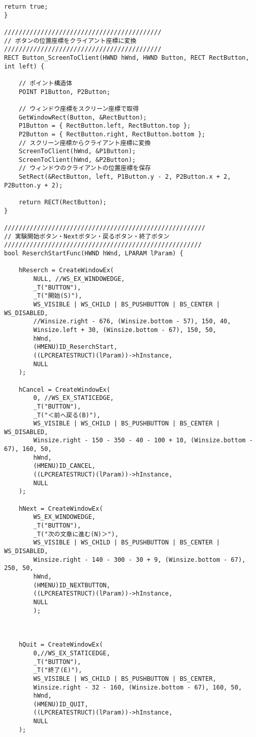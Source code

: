 \begin{lstlisting}[caption=window.cpp]
	return true;
}

///////////////////////////////////////////
// ボタンの位置座標をクライアント座標に変換
///////////////////////////////////////////
RECT Button_ScreenToClient(HWND hWnd, HWND Button, RECT RectButton, int left) {

	// ポイント構造体
	POINT P1Button, P2Button;

	// ウィンドウ座標をスクリーン座標で取得
	GetWindowRect(Button, &RectButton);
	P1Button = { RectButton.left, RectButton.top };
	P2Button = { RectButton.right, RectButton.bottom };
	// スクリーン座標からクライアント座標に変換
	ScreenToClient(hWnd, &P1Button);
	ScreenToClient(hWnd, &P2Button);
	// ウィンドウのクライアントの位置座標を保存
	SetRect(&RectButton, left, P1Button.y - 2, P2Button.x + 2, P2Button.y + 2);

	return RECT(RectButton);
}

///////////////////////////////////////////////////////
// 実験開始ボタン・Nextボタン・戻るボタン・終了ボタン
//////////////////////////////////////////////////////
bool ReserchStartFunc(HWND hWnd, LPARAM lParam) {

	hReserch = CreateWindowEx(
		NULL, //WS_EX_WINDOWEDGE,
		_T("BUTTON"),
		_T("開始(S)"),
		WS_VISIBLE | WS_CHILD | BS_PUSHBUTTON | BS_CENTER | WS_DISABLED,
		//Winsize.right - 676, (Winsize.bottom - 57), 150, 40,
		Winsize.left + 30, (Winsize.bottom - 67), 150, 50,
		hWnd,
		(HMENU)ID_ReserchStart,
		((LPCREATESTRUCT)(lParam))->hInstance,
		NULL
	);

	hCancel = CreateWindowEx(
		0, //WS_EX_STATICEDGE,
		_T("BUTTON"),
		_T("＜前へ戻る(B)"),
		WS_VISIBLE | WS_CHILD | BS_PUSHBUTTON | BS_CENTER | WS_DISABLED,
		Winsize.right - 150 - 350 - 40 - 100 + 10, (Winsize.bottom - 67), 160, 50,
		hWnd,
		(HMENU)ID_CANCEL,
		((LPCREATESTRUCT)(lParam))->hInstance,
		NULL
	);

	hNext = CreateWindowEx(
		WS_EX_WINDOWEDGE,
		_T("BUTTON"),
		_T("次の文章に進む(N)＞"),
		WS_VISIBLE | WS_CHILD | BS_PUSHBUTTON | BS_CENTER | WS_DISABLED,
		Winsize.right - 140 - 300 - 30 + 9, (Winsize.bottom - 67), 250, 50,
		hWnd,
		(HMENU)ID_NEXTBUTTON,
		((LPCREATESTRUCT)(lParam))->hInstance,
		NULL
		);

	

	hQuit = CreateWindowEx(
		0,//WS_EX_STATICEDGE,
		_T("BUTTON"),
		_T("終了(E)"),
		WS_VISIBLE | WS_CHILD | BS_PUSHBUTTON | BS_CENTER,
		Winsize.right - 32 - 160, (Winsize.bottom - 67), 160, 50,
		hWnd,
		(HMENU)ID_QUIT,
		((LPCREATESTRUCT)(lParam))->hInstance,
		NULL
	);


\end{lstlisting}

